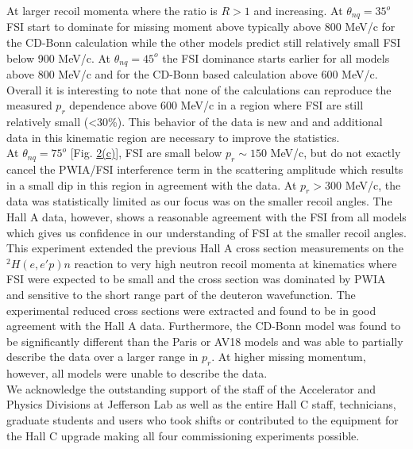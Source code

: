 At larger recoil momenta where the ratio is $R>1$ and increasing.  At $\theta_{nq}=35^{o}$ FSI start to dominate for missing moment above typically above 800 MeV/c for the CD-Bonn calculation
while the other models predict still relatively small FSI below 900 MeV/c. At $\theta_{nq}=45^{o}$ the FSI dominance starts earlier for all models above 800 MeV/c and for the CD-Bonn based
calculation above 600 MeV/c. \\
\indent Overall it is interesting to note that none of the calculations can reproduce the measured $p_r$ dependence above 600 MeV/c in a region where FSI are still relatively small (<30\%).  This behavior of the data is new and 
and additional data in this kinematic region are necessary to improve the statistics. \\
\indent At $\theta_{nq}=75^{o}$ [Fig. \hyperref[fig:fig2]{2(c)}], FSI are small below $p_{r}\sim150$ MeV/c, but do not exactly cancel the PWIA/FSI interference term in the scattering amplitude which results in a small dip in this region in agreement with the data.
At $p_{r}>300$ MeV/c, the data was statistically limited as our focus was on the smaller recoil angles. The Hall A data, however, shows a reasonable agreement with the FSI from all models which gives us confidence in our understanding
of FSI at the smaller recoil angles. \\
\indent This experiment extended the previous Hall A cross section measurements on the $^{2}H(e,e'p)n$ reaction to 
very high neutron recoil momenta at kinematics where FSI were expected to be small and the cross section was dominated by PWIA and sensitive to the
short range part of the deuteron wavefunction. The experimental reduced cross sections were extracted and found to be in good agreement with the Hall A data.
Furthermore, the CD-Bonn model was found to be significantly different than the Paris or AV18 models and was able to partially describe the data over a larger range in $p_{r}$.
At higher missing momentum, however, all models were unable to describe the data. \\
\indent We acknowledge the outstanding support of the staff of the Accelerator and Physics Divisions at Jefferson Lab
as well as the entire Hall C staff, technicians, graduate students and users who took shifts or contributed
to the equipment for the Hall C upgrade making all four commissioning experiments possible. 

